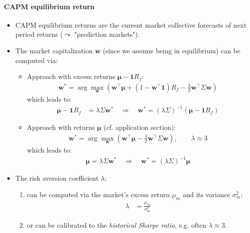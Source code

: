\documentclass[a4paper,landscape,8pt,fleqn]{scrartcl}
\begin{document}
\begin{multicols*}{3}
\paragraph{CAPM equilibrium return}
\begin{itemize}
\item CAPM equilibrium returns are the current market collective forecasts of next period returns ($\leadsto$ "prediction markets").
\item The market capitalization $\bm w$ (since we assume being in equilibrium) can be computed via:
\begin{itemize}
\item Approach with excess returns $\bm \mu - \bm 1 R_f$:
\begin{align*}
\bm w^\ast = \arg\max_{\bm w} \left( \bm w^\top \bm \mu + (1 - \bm w^\top \bm 1)R_f - \frac{\lambda}{2} \bm w^\top \Sigma \bm w \right)
\end{align*}
which leads to:
\begin{align*}
\bm \mu - \bm 1 R_f &= \lambda \Sigma \bm w^\ast \quad \Rightarrow \quad
\bm w^\ast = (\lambda \Sigma)^{-1} (\bm \mu - \bm 1 R_f)
\end{align*}
\item Approach with returns $\bm \mu$ (cf. application section):
\begin{align*}
\bm w^\ast = \arg\max_{\bm w} \left( \bm w^\top \bm \mu - \frac{\lambda}{2} \bm w^\top \Sigma \bm w \right), \qquad \lambda \approx 3
\end{align*}
which leads to:
\begin{align*}
\bm \mu = \lambda \Sigma \bm w^\ast \quad \Rightarrow \quad
\bm w^\ast = (\lambda \Sigma)^{-1} \bm \mu
\end{align*}
\end{itemize}
\item The risk aversion coefficient $\lambda$:
\begin{enumerate}
\item can be computed via the market's excess return $\mu_m$ and its variance $\sigma_m^2$:
\begin{align*}
\lambda &= \frac{\mu_m}{\sigma_m^2}
\end{align*}
\item or can be calibrated to the \textit{historical Sharpe ratio}, e.g. often $\lambda \approx 3$.
\end{enumerate}
\end{itemize}


\end{multicols*}
\end{document}
